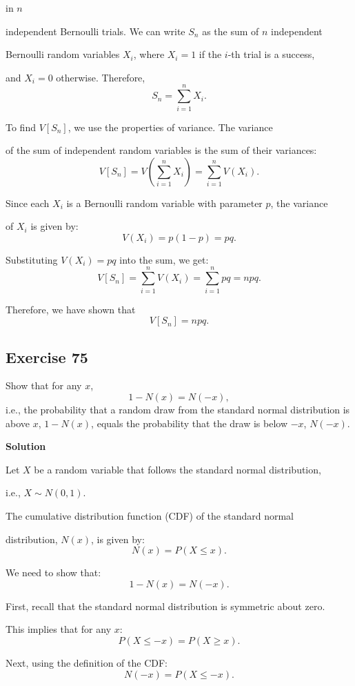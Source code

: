 \documentclass{article}
\begin{document}
in \( n \) 

independent Bernoulli trials. We can write \( S_n \) as the sum of \( n \) independent 

Bernoulli random variables \( X_i \), where \( X_i = 1 \) if the \( i \)-th trial is a success, 

and \( X_i = 0 \) otherwise. Therefore,
\[
S_n = \sum_{i=1}^n X_i.
\]

To find \( V[S_n] \), we use the properties of variance. The variance 

of the sum of independent random variables is the sum of their variances:
\[
V[S_n] = V\left( \sum_{i=1}^n X_i \right) = \sum_{i=1}^n V(X_i).
\]

Since each \( X_i \) is a Bernoulli random variable with parameter \( p \), the variance 

of \( X_i \) is given by:
\[
V(X_i) = p(1 - p) = pq.
\]

Substituting \( V(X_i) = pq \) into the sum, we get:
\[
V[S_n] = \sum_{i=1}^n V(X_i) = \sum_{i=1}^n pq = npq.
\]

Therefore, we have shown that
\[
V[S_n] = npq.
\]

\subsection*{Exercise 75}

Show that for any \( x \),
\[
1 - N(x) = N(-x),
\]
i.e., the probability that a random draw from the standard normal distribution is above \( x \), \( 1 - N(x) \), equals the probability that the draw is below \( -x \), \( N(-x) \).

\textbf{Solution}

Let \( X \) be a random variable that follows the standard normal distribution, 

i.e., \( X \sim N(0, 1) \).

\vspace{\baselineskip}

The cumulative distribution function (CDF) of the standard normal 

distribution, \( N(x) \), is given by:
\[
N(x) = P(X \leq x).
\]

We need to show that:
\[
1 - N(x) = N(-x).
\]

First, recall that the standard normal distribution is symmetric about zero. 

This implies that for any \( x \):
\[
P(X \leq -x) = P(X \geq x).
\]

Next, using the definition of the CDF:
\[
N(-x) = P(X \leq -x).
\]
\end{document}
